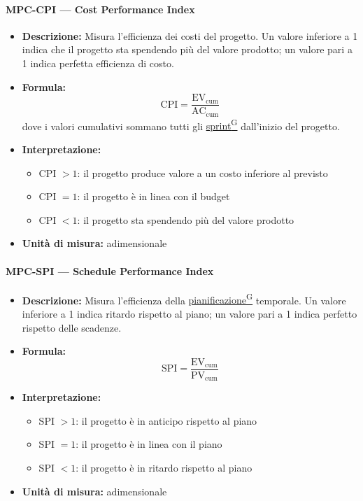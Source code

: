 \documentclass[a4paper,12pt]{article}
\providecommand{\glslink}[2]{\href{https://alittlebyte-19.github.io/Documentazione/glossario.html\#gls-#1}{\underline{#2}\textsuperscript{\scriptsize G}}}
\begin{document}
\paragraph{MPC-CPI --- Cost Performance Index}
\begin{itemize}
    \item \textbf{Descrizione:} Misura l'efficienza dei costi del progetto. Un valore inferiore a 1 indica che il progetto sta spendendo più del valore prodotto; un valore pari a 1 indica perfetta efficienza di costo.
    \item \textbf{Formula:}
    $$\text{CPI} = \frac{\text{EV}_{\text{cum}}}{\text{AC}_{\text{cum}}}$$
    dove i valori cumulativi sommano tutti gli \glslink{sprint}{sprint} dall'inizio del progetto.
    \item \textbf{Interpretazione:}
    \begin{itemize}
        \item CPI $> 1$: il progetto produce valore a un costo inferiore al previsto
        \item CPI $= 1$: il progetto è in linea con il budget
        \item CPI $< 1$: il progetto sta spendendo più del valore prodotto
    \end{itemize}
    \item \textbf{Unità di misura:} adimensionale
\end{itemize}

\paragraph{MPC-SPI --- Schedule Performance Index}
\begin{itemize}
    \item \textbf{Descrizione:} Misura l'efficienza della \glslink{pianificazione}{pianificazione} temporale. Un valore inferiore a 1 indica ritardo rispetto al piano; un valore pari a 1 indica perfetto rispetto delle scadenze.
    \item \textbf{Formula:}
    $$\text{SPI} = \frac{\text{EV}_{\text{cum}}}{\text{PV}_{\text{cum}}}$$
    \item \textbf{Interpretazione:}
    \begin{itemize}
        \item SPI $> 1$: il progetto è in anticipo rispetto al piano
        \item SPI $= 1$: il progetto è in linea con il piano
        \item SPI $< 1$: il progetto è in ritardo rispetto al piano
    \end{itemize}
    \item \textbf{Unità di misura:} adimensionale
\end{itemize}
\end{document}
